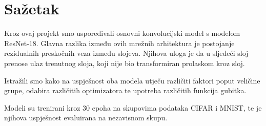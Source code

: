 \chapter{Sažetak}

Kroz ovaj projekt smo uspoređivali osnovni konvolucijski model s modelom ResNet-18. Glavna razlika između ovih mrežnih arhitektura je postojanje rezidualnih preskočnih veza između slojeva. Njihova uloga je da u sljedeći sloj prenose ulaz trenutnog sloja, koji nije bio transformiran prolaskom kroz sloj. 

\bigskip

Istražili smo kako na uspješnost oba modela utječu različiti faktori poput veličine grupe, odabira različitih optimizatora te upotreba različitih funkcija gubitka. 

\bigskip

Modeli su trenirani kroz 30 epoha na skupovima podataka CIFAR i MNIST, te je njihova uspješnost evaluirana na nezavisnom skupu.
